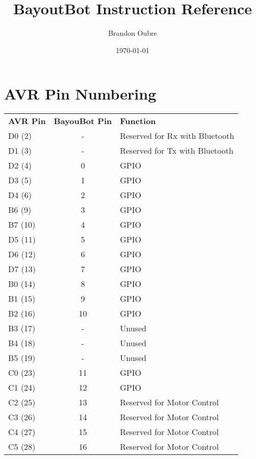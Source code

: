 \documentclass[letterpaper,titlepage]{article}
\begin{document}
	\title{BayoutBot Instruction Reference}
	\author{Brandon Oubre}
	\date{\today}
	\maketitle
	
	\newcommand{\instrDesc}[2]{
		\textbf{#1} \\
		#2 \\
	}

	\section*{AVR Pin Numbering}
	\begin{tabular}{l | c | l}
	\textbf{AVR Pin} & \textbf{BayouBot Pin} & \textbf{Function} \\
	D0 (2) & - & Reserved for Rx with Bluetooth \\
	D1 (3) & - & Reserved for Tx with Bluetooth \\
	D2 (4) & 0 & GPIO \\
	D3 (5) & 1 & GPIO \\
	D4 (6) & 2 & GPIO \\
	B6 (9) & 3 & GPIO \\
	B7 (10) & 4 & GPIO \\
	D5 (11) & 5 & GPIO \\
	D6 (12) & 6 & GPIO \\
	D7 (13) & 7 & GPIO \\
	B0 (14) & 8 & GPIO \\
	B1 (15) & 9 & GPIO \\
	B2 (16) & 10 & GPIO \\
	B3 (17) & - & Unused \\
	B4 (18) & - & Unused \\
	B5 (19) & - & Unused \\
	C0 (23) & 11 & GPIO \\
	C1 (24) & 12 & GPIO \\
	C2 (25) & 13 & Reserved for Motor Control \\
	C3 (26) & 14 & Reserved for Motor Control \\
	C4 (27) & 15 & Reserved for Motor Control \\
	C5 (28) & 16 & Reserved for Motor Control \\
	\end{tabular}
	\clearpage
\end{document}
